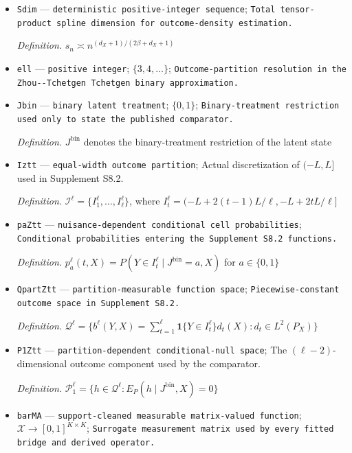 \documentclass{article}
\begin{document}
\begin{itemize}
  \item \texttt{Sdim} --- \texttt{deterministic positive-\allowbreak{}integer sequence}; \texttt{Total tensor-\allowbreak{}product spline dimension for outcome-\allowbreak{}density estimation.}
  \par\smallskip\noindent\emph{Definition.} \(s_n\asymp n^{(d_X+1)/(2\beta+d_X+1)}\)
  \item \texttt{ell} --- \texttt{positive integer}; \(\{3,4,\ldots\}\); \texttt{Outcome-\allowbreak{}partition resolution in the Zhou-\allowbreak{}-\allowbreak{}Tchetgen Tchetgen binary approximation.}
  \item \texttt{Jbin} --- \texttt{binary latent treatment}; \(\{0,1\}\); \texttt{Binary-\allowbreak{}treatment restriction used only to state the published comparator.}
  \par\smallskip\noindent\emph{Definition.} \(J^{\mathrm{bin}}\) denotes the binary-treatment restriction of the latent state
  \item \texttt{Iztt} --- \texttt{equal-\allowbreak{}width outcome partition}; Actual discretization of \((-L,L]\) used in Supplement S8.2.
  \par\smallskip\noindent\emph{Definition.} \(\mathcal I^{\ell}=\{I_1^{\ell},\ldots,I_{\ell}^{\ell}\}\), where \(I_t^{\ell}=(-L+2(t-1)L/\ell,-L+2tL/\ell]\)
  \item \texttt{paZtt} --- \texttt{nuisance-\allowbreak{}dependent conditional cell probabilities}; \texttt{Conditional probabilities entering the Supplement S8.2 functions.}
  \par\smallskip\noindent\emph{Definition.} \(p_a^{\ell}(t,X)=P(Y\in I_t^{\ell}\mid J^{\mathrm{bin}}=a,X)\) for \(a\in\{0,1\}\)
  \item \texttt{QpartZtt} --- \texttt{partition-\allowbreak{}measurable function space}; \texttt{Piecewise-\allowbreak{}constant outcome space in Supplement S8.2.}
  \par\smallskip\noindent\emph{Definition.} \(\mathcal Q^{\ell}=\{b^{\ell}(Y,X)=\sum_{t=1}^{\ell}\mathbf 1\{Y\in I_t^{\ell}\}d_t(X):d_t\in L^2(P_X)\}\)
  \item \texttt{P1Ztt} --- \texttt{partition-\allowbreak{}dependent conditional-\allowbreak{}null space}; The \((\ell-2)\)-dimensional outcome component used by the comparator.
  \par\smallskip\noindent\emph{Definition.} \(\mathcal P_1^{\ell}=\{h\in\mathcal Q^{\ell}:E_P(h\mid J^{\mathrm{bin}},X)=0\}\)
  \item \texttt{barMA} --- \texttt{support-\allowbreak{}cleaned measurable matrix-\allowbreak{}valued function}; \(\mathcal X\to[0,1]^{K\times K}\); \texttt{Surrogate measurement matrix used by every fitted bridge and derived operator.}

\end{itemize}
\end{document}
